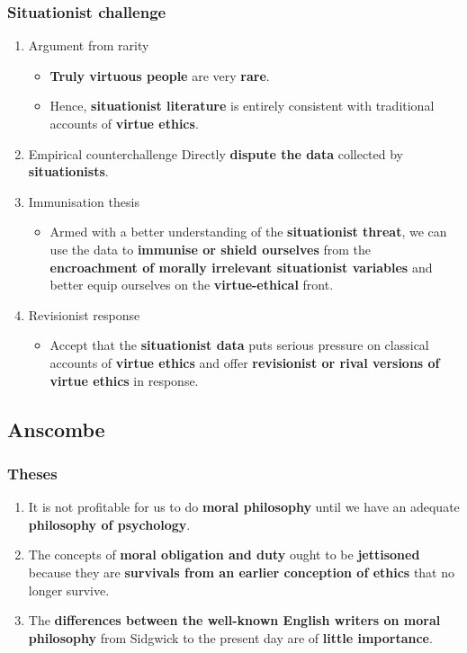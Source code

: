 \documentclass[11pt]{article}
\begin{document}
\subsubsection{Situationist challenge}
\label{sec:orge036cc4}
\begin{enumerate}
\item Argument from rarity
\begin{itemize}
\item \textbf{Truly virtuous people} are very \textbf{rare}.
\item Hence, \textbf{situationist literature} is entirely consistent with traditional accounts of \textbf{virtue ethics}.
\end{itemize}
\item Empirical counterchallenge
Directly \textbf{dispute the data} collected by \textbf{situationists}.
\item Immunisation thesis
\begin{itemize}
\item Armed with a better understanding of the \textbf{situationist threat}, we can use the data to \textbf{immunise or shield ourselves} from the \textbf{encroachment of morally irrelevant situationist variables} and better equip ourselves on the \textbf{virtue-ethical} front.
\end{itemize}
\item Revisionist response
\begin{itemize}
\item Accept that the \textbf{situationist data} puts serious pressure on classical accounts of \textbf{virtue ethics} and offer \textbf{revisionist or rival versions of virtue ethics} in response.
\end{itemize}
\end{enumerate}

 \newpage
\subsection{Anscombe}
\label{sec:org1b6b690}

\subsubsection{Theses}
\label{sec:orgeadb590}
\begin{enumerate}
\item It is not profitable for us to do \textbf{moral philosophy} until we have an adequate \textbf{philosophy of psychology}.
\item The concepts of \textbf{moral obligation and duty} ought to be \textbf{jettisoned} because they are \textbf{survivals from an earlier conception of ethics} that no longer survive.
\item The \textbf{differences between the well-known English writers on moral philosophy} from Sidgwick to the present day are of \textbf{little importance}.
\end{enumerate}
\end{document}

